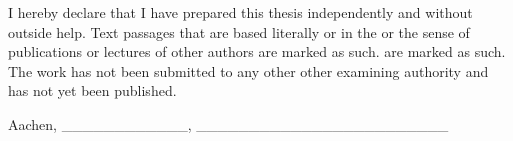 I hereby declare that I have prepared this thesis independently and
without outside help. Text passages that are based literally or in the
or the sense of publications or lectures of other authors are marked as such.
are marked as such. The work has not been submitted to any other
other examining authority and has not yet been published.

Aachen, \datum  \_\_\_\_\_\_\_\_\_\_\_\_,
\_\_\_\_\_\_\_\_\_\_\_\_\_\_\_\_\_\_\_\_\_\_\_\_
